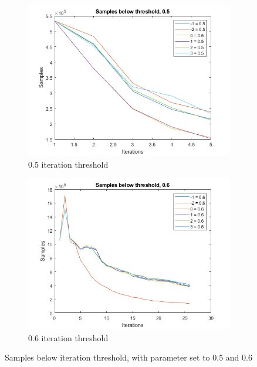 \begin{figure}
    \centering
    \begin{subfigure}[b]{.45\textwidth}
        \centering
        \includegraphics[width=\textwidth]{figures/iterbelow-0.5.png}
        \caption{0.5 iteration threshold}
        \label{sfig:iter:iterbelow0.5}
    \end{subfigure}
    \hfill
    \begin{subfigure}[b]{.45\textwidth}
        \centering
        \includegraphics[width=\textwidth]{figures/iterbelow-0.6.png}
        \caption{0.6 iteration threshold}
        \label{sfig:iter:iterbelow0.6}
    \end{subfigure}
    \caption{Samples below iteration threshold, with parameter set to 0.5 and 0.6}
    \label{fig:iter:iterbelow0.50.6}
\end{figure}

